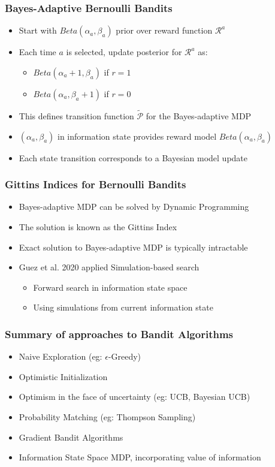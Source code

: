 \documentclass[handout]{beamer}
\begin{document}
\begin{frame}
\frametitle{Bayes-Adaptive Bernoulli Bandits}
\pause
\begin{itemize}[<+->]
\item Start with $Beta(\alpha_a, \beta_a)$ prior over reward function $\mathcal{R}^a$
\item Each time $a$ is selected, update posterior for $\mathcal{R}^a$ as:
\begin{itemize}
\item $Beta(\alpha_a+1, \beta_a)$ if $r=1$
\item $Beta(\alpha_a, \beta_a+1)$ if $r=0$
\end{itemize}
\item This defines transition function $\tilde{\mathcal{P}}$ for the Bayes-adaptive MDP
\item $(\alpha_a, \beta_a)$ in information state provides reward model $Beta(\alpha_a, \beta_a)$
\item Each state transition corresponds to a Bayesian model update
\end{itemize}
\end{frame}

\begin{frame}
\frametitle{Gittins Indices for Bernoulli Bandits}
\pause
\begin{itemize}[<+->]
\item Bayes-adaptive MDP can be solved by Dynamic Programming
\item The solution is known as the Gittins Index
\item Exact solution to Bayes-adaptive MDP is typically intractable
\item Guez et al. 2020 applied Simulation-based search
\begin{itemize}
\item Forward search in information state space
\item Using simulations from current information state
\end{itemize}
\end{itemize}
\end{frame}

\begin{frame}
\frametitle{Summary of approaches to Bandit Algorithms}
\pause
\begin{itemize}[<+->]
\item Naive Exploration (eg: $\epsilon$-Greedy)
\item Optimistic Initialization
\item Optimism in the face of uncertainty (eg: UCB, Bayesian UCB)
\item Probability Matching (eg: Thompson Sampling)
\item Gradient Bandit Algorithms
\item Information State Space MDP, incorporating value of information
\end{itemize}
\end{frame}
\end{document}

